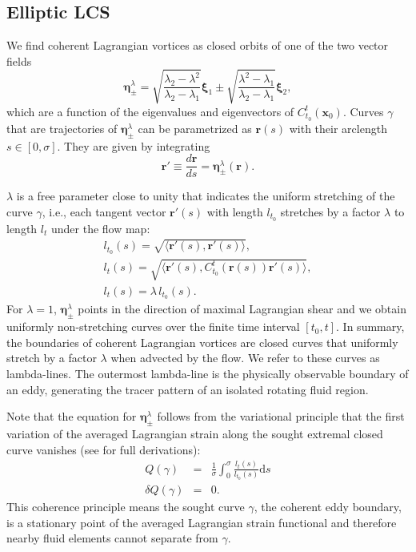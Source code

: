 \documentclass{article}
\begin{document}
\subsection{Elliptic LCS}
We find coherent Lagrangian vortices as closed orbits of one of the two vector fields
\begin{equation}
\boldsymbol \eta^{\lambda}_\pm = \sqrt{\frac{\lambda_2 - \lambda^2}{\lambda_2 - \lambda_1}} \boldsymbol \xi_1 \pm \sqrt{\frac{\lambda^2 - \lambda_1}{\lambda_2 - \lambda_1}} \boldsymbol \xi_2,
\label{eq:eta}
\end{equation}
which are a function of the eigenvalues and eigenvectors of $C_{t_0}^t(\boldsymbol x_0)$. Curves $\gamma$ that are trajectories of $\boldsymbol \eta^{\lambda}_\pm$ can be parametrized as $\boldsymbol r(s)$ with their arclength $s \in [0,\sigma]$. They are given by integrating
\begin{equation}
\boldsymbol r' \equiv \frac{d \boldsymbol r}{ds} = \boldsymbol \eta^{\lambda}_\pm(\boldsymbol r).
\label{eq:etafields}
\end{equation}

$\lambda$ is a free parameter close to unity that indicates the uniform stretching of the curve $\gamma$, i.e., each tangent vector $\boldsymbol r'(s)$ with length $l_{t_0}$ stretches by a factor $\lambda$ to length $l_{t}$ under the flow map:
\begin{gather*}
l_{t_0}(s) = \sqrt{\langle \boldsymbol r'(s), \boldsymbol r'(s) \rangle},\\
l_t(s) = \sqrt{\langle \boldsymbol r'(s), C_{t_0}^t(\boldsymbol r(s)) \boldsymbol r'(s) \rangle},\\
l_t(s) = \lambda\, l_{t_0}(s).
\end{gather*}
For $\lambda=1$, $\boldsymbol \eta^{\lambda}_\pm$ points in the direction of maximal Lagrangian shear and we obtain uniformly non-stretching curves over the finite time interval $[t_0, t]$. In summary, the boundaries of coherent Lagrangian vortices are closed curves that uniformly stretch by a factor $\lambda$ when advected by the flow. We refer to these curves as lambda-lines. The outermost lambda-line is the physically observable boundary of an eddy, generating the tracer pattern of an isolated rotating fluid region.

Note that the equation for $\boldsymbol \eta^{\lambda}_\pm$ follows from the variational principle that the first variation of the averaged Lagrangian strain along the sought extremal closed curve vanishes (see \parencite{haller13:_coher_lagran} for full derivations):
\begin{eqnarray*}
Q(\gamma) &=& \frac{1}{\sigma} \int_0^\sigma \frac{l_t(s)}{l_{t_0}(s)}\text{d}s\\
\delta Q(\gamma) &=& 0.
\end{eqnarray*}
This coherence principle means the sought curve $\gamma$, the coherent eddy boundary, is a stationary point of the averaged Lagrangian strain functional and therefore nearby fluid elements cannot separate from $\gamma$.
\end{document}
